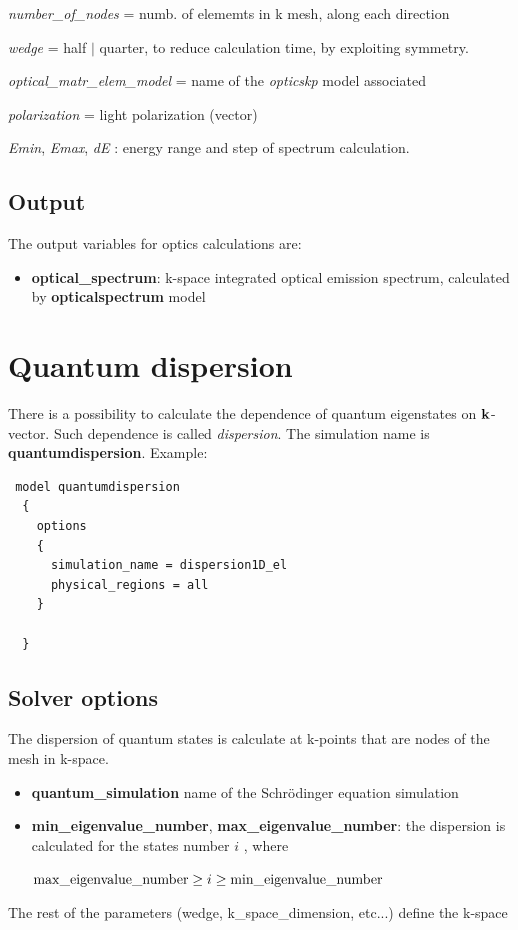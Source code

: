 \textit{number\_of\_nodes} = numb. of  elememts in k mesh, along each direction

\textit{wedge} = half $\vert$  quarter,  to  reduce  calculation time,  by  exploiting  symmetry.

\textit{optical\_matr\_elem\_model} = name of  the  \textit{opticskp} model associated 

\textit{polarization} =  light polarization (vector)

\textit{Emin}, \textit{Emax}, \textit{dE} :  energy range  and step of  spectrum calculation.






\section{Output}

The output  variables for  optics  calculations are:
\begin{itemize}
\item  \textbf{optical\_spectrum}: k-space integrated optical emission spectrum, calculated by \textbf{opticalspectrum} model
\end{itemize}



\chapter{Quantum dispersion}
There is a possibility to calculate the dependence of quantum eigenstates on ${\bf k}$-vector.
Such dependence is called \textit{dispersion}. The simulation name is \textbf{quantumdispersion}. Example:
\begin{verbatim}
 model quantumdispersion
  {
    options
    {
      simulation_name = dispersion1D_el
      physical_regions = all
    }
    
  }
\end{verbatim}

\section{Solver options}
The dispersion of quantum states is calculate at k-points that are nodes of the mesh in k-space. 
\begin{itemize}
 \item \textbf{quantum\_simulation} name of the Schr\"odinger equation simulation
 \item \textbf{min\_eigenvalue\_number}, \textbf{max\_eigenvalue\_number}: the dispersion is 
calculated for the states number $i$ , where

 ${\rm max\_eigenvalue\_number} \ge i \ge 
{\rm min\_eigenvalue\_number} $ 
\end{itemize}
The rest of the parameters (wedge, k\_space\_dimension, etc...) define the k-space


